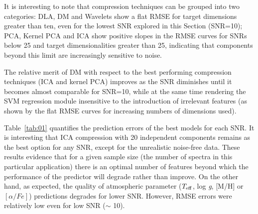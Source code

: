 \documentclass[a4paper,fleqn,usenatbib]{mnras}
\begin{document}
{{{It is interesting to note that compression techniques can be grouped
into two categories: DLA, DM and Wavelets show a flat RMSE for target
dimensions greater than ten, even for the lowest SNR explored in this
Section (SNR=10); PCA, Kernel PCA and ICA show positive slopes in the
RMSE curves for SNRs below 25 and target dimensionalities greater than
25, indicating that components beyond this limit are increasingly
sensitive to noise. 

The relative merit of DM with respect to the best
performing compression techniques (ICA and kernel PCA) improves as the
SNR diminishes until it becomes almost comparable for SNR=10, while at
the same time rendering the SVM regression module insensitive to the
introduction of irrelevant features (as shown by the flat RMSE curves
for increasing numbers of dimensions used). 

Table~\ref{tab:01} quantifies the prediction errors of the best models
for each SNR. It is interesting that ICA compression with 20
independent components remains as the best option for any SNR, except
for the unrealistic noise-free data. 
These results evidence that for a given sample
size (the number of spectra in this particular application) there is
an optimal number of features beyond which the performance of the
predictor will degrade rather than improve.  On the other hand, as
expected, the quality of atmospheric parameter ($T_{\rm eff}$, log
\textit{g}, [M/H] or  $\left[ \alpha/Fe \right]$) predictions degrades 
for lower SNR. However, RMSE errors were relatively low even for 
low SNR ($\sim$ 10).  

}}}
\end{document}
